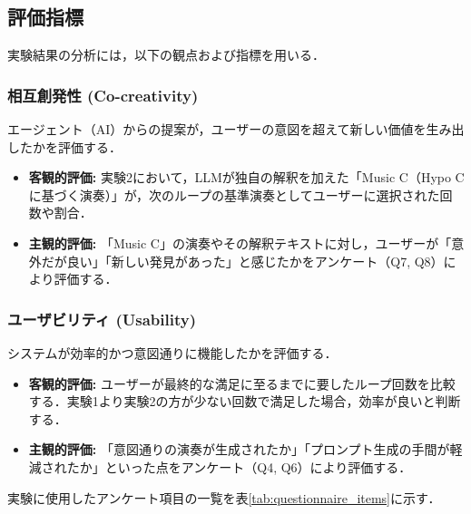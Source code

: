 \subsection{評価指標}
\label{subsec:評価指標}

実験結果の分析には，以下の観点および指標を用いる．

\subsubsection*{相互創発性 (Co-creativity)}
エージェント（AI）からの提案が，ユーザーの意図を超えて新しい価値を生み出したかを評価する．
\begin{itemize}
    \item \textbf{客観的評価:} 実験2において，LLMが独自の解釈を加えた「Music C（Hypo Cに基づく演奏）」が，次のループの基準演奏としてユーザーに選択された回数や割合．
    \item \textbf{主観的評価:} 「Music C」の演奏やその解釈テキストに対し，ユーザーが「意外だが良い」「新しい発見があった」と感じたかをアンケート（Q7, Q8）により評価する．
\end{itemize}

\subsubsection*{ユーザビリティ (Usability)}
システムが効率的かつ意図通りに機能したかを評価する．
\begin{itemize}
    \item \textbf{客観的評価:} ユーザーが最終的な満足に至るまでに要したループ回数を比較する．実験1より実験2の方が少ない回数で満足した場合，効率が良いと判断する．
    \item \textbf{主観的評価:} 「意図通りの演奏が生成されたか」「プロンプト生成の手間が軽減されたか」といった点をアンケート（Q4, Q6）により評価する．
\end{itemize}

実験に使用したアンケート項目の一覧を表\ref{tab:questionnaire_items}に示す．

